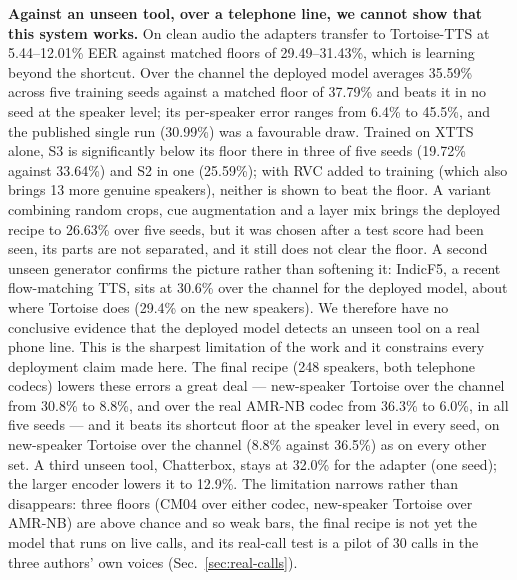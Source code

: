 \textbf{Against an unseen tool, over a telephone line, we cannot show that this system
works.} On clean audio the adapters transfer to Tortoise-TTS at 5.44--12.01\% EER
against matched floors of 29.49--31.43\%, which is learning beyond the shortcut. Over
the channel the deployed model averages 35.59\% across five training seeds against a
matched floor of 37.79\% and beats it in no seed at the speaker level; its
per-speaker error ranges from 6.4\% to 45.5\%, and the published single run
(30.99\%) was a favourable draw. Trained on XTTS alone, S3 is significantly below its
floor there in three of five seeds (19.72\% against 33.64\%) and S2 in one (25.59\%); with
RVC added to training (which also brings 13 more genuine speakers), neither is shown to beat
the floor. A
variant combining random crops, cue augmentation and a layer mix brings the deployed recipe
to 26.63\% over five seeds, but it was chosen after a test score had been seen, its parts
are not separated, and it still does not clear the floor. A second unseen generator confirms the picture
rather than softening it: IndicF5, a recent flow-matching TTS, sits at 30.6\% over the
channel for the deployed model, about where Tortoise does (29.4\% on the new
speakers). We therefore have no conclusive evidence that the
deployed model detects an unseen tool on a real phone line. This is the sharpest
limitation of the work and it constrains every deployment claim made here. The final recipe
(248 speakers, both telephone codecs) lowers these errors a great deal --- new-speaker
Tortoise over the channel from 30.8\% to 8.8\%, and over the real AMR-NB codec from
36.3\% to 6.0\%, in all five seeds --- and it beats its shortcut floor at the speaker
level in every seed, on new-speaker Tortoise over the channel (8.8\% against 36.5\%) as on
every other set. A third unseen tool, Chatterbox, stays at 32.0\% for the adapter (one
seed); the larger encoder lowers it to 12.9\%. The limitation narrows rather than
disappears: three floors (CM04 over either codec, new-speaker Tortoise over AMR-NB) are
above chance and so weak bars, the final
recipe is not yet the model that runs on live calls, and its real-call test is a pilot of
30 calls in the three authors' own voices (Sec.~\ref{sec:real-calls}).

